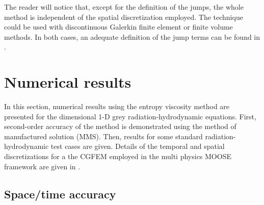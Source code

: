 The reader will notice that, except for the definition of the jumps, the whole method is independent of the spatial discretization employed. The technique could be used with discontinuous Galerkin finite element or finite volume methods. In both cases, an adequate  definition of the jump terms can be found in \cite{valentin}.

\section{Numerical results}
\label{sec:num-res}

In this section, numerical results using the entropy viscosity method are presented for the dimensional 1-D grey radiation-hydrodynamic equations. First, second-order accuracy of the method is demonstrated using the method of manufactured solution (MMS). Then, results for some standard radiation-hydrodynamic test cases are given. Details of the temporal and spatial discretizations for a the CGFEM employed in the multi physics MOOSE framework \cite{Moose} are given in .
\subsection{Space/time accuracy}
\label{sec:MMS}

